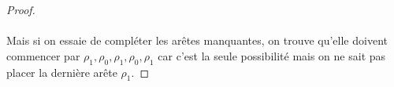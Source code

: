 \begin{proof}
\begin{figure}[H]
\begin{center}
\begin{tikzpicture}
    \end{tikzpicture}
    \caption{}
  \end{center}
\end{figure}

\paragraph{}
Mais si on essaie de compléter les arêtes manquantes, on trouve qu'elle doivent commencer par $\rho_1, \rho_0, \rho_1, \rho_0, \rho_1$ car c'est la seule possibilité mais on ne sait pas placer la dernière arête $\rho_1$.

\end{proof}
